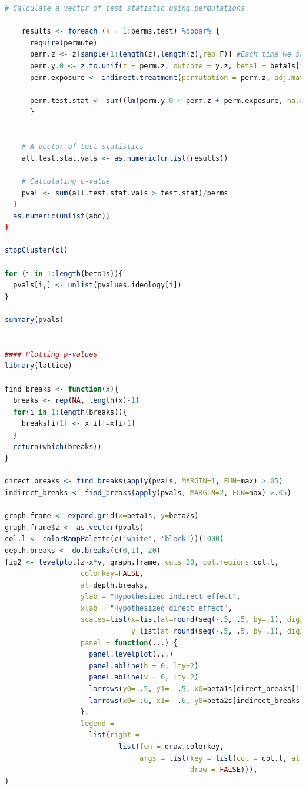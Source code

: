 \documentclass[12pt]{article}
\begin{document}
\begin{lstlisting}[language=R]
    # Calculate a vector of test statistic using permutations
    
    results <- foreach (k = 1:perms.test) %dopar% {
      require(permute)
      perm.z <- z[sample(1:length(z),length(z),rep=F)] #Each time we sample a permutation of z
      perm.y.0 <- z.to.unif(z = perm.z, outcome = y.z, beta1 = beta1s[i], beta2 = beta2s[j], permutation = perm, adj.mat = S.ideo)
      perm.exposure <- indirect.treatment(permutation = perm.z, adj.mat = S.ideo)
      
      perm.test.stat <- sum((lm(perm.y.0 ~ perm.z + perm.exposure, na.action = na.omit)$resid)^2)
      }
    
    
    # A vector of test statistics
    all.test.stat.vals <- as.numeric(unlist(results))
    
    # Calculating p-value
    pval <- sum(all.test.stat.vals > test.stat)/perms
  }
  as.numeric(unlist(abc))
}

stopCluster(cl)

for (i in 1:length(beta1s)){
  pvals[i,] <- unlist(pvalues.ideology[i])
}

summary(pvals)


#### Plotting p-values
library(lattice)

find_breaks <- function(x){
  breaks <- rep(NA, length(x)-1)
  for(i in 1:length(breaks)){
    breaks[i+1] <- x[i]!=x[i+1]
  }
  return(which(breaks))
}

direct_breaks <- find_breaks(apply(pvals, MARGIN=1, FUN=max) >.05)
indirect_breaks <- find_breaks(apply(pvals, MARGIN=2, FUN=max) >.05)

graph.frame <- expand.grid(x=beta1s, y=beta2s)
graph.frame$z <- as.vector(pvals)
col.l <- colorRampPalette(c('white', 'black'))(1000)
depth.breaks <- do.breaks(c(0,1), 20)
fig2 <- levelplot(z~x*y, graph.frame, cuts=20, col.regions=col.l,
                  colorkey=FALSE,
                  at=depth.breaks,
                  ylab = "Hypothesized indirect effect",
                  xlab = "Hypothesized direct effect",
                  scales=list(x=list(at=round(seq(-.5, .5, by=.1), digits=1), labels=round(seq(-.7, .2, by=.1), digits=1)),
                              y=list(at=round(seq(-.5, .5, by=.1), digits=1), labels=round(seq(-.7, .2, by=.1), digits=1))),
                  panel = function(...) {
                    panel.levelplot(...)
                    panel.abline(h = 0, lty=2)
                    panel.abline(v = 0, lty=2)
                    larrows(y0=-.5, y1= -.5, x0=beta1s[direct_breaks[1]], x1=beta1s[direct_breaks[2]], angle=90,code=3)
                    larrows(x0=-.6, x1= -.6, y0=beta2s[indirect_breaks[1]], y1=beta2s[indirect_breaks[2]], angle=90,code=3)
                  },
                  legend = 
                    list(right = 
                           list(fun = draw.colorkey,
                                args = list(key = list(col = col.l, at = depth.breaks),
                                            draw = FALSE))),
)



\end{lstlisting}
\end{document}
